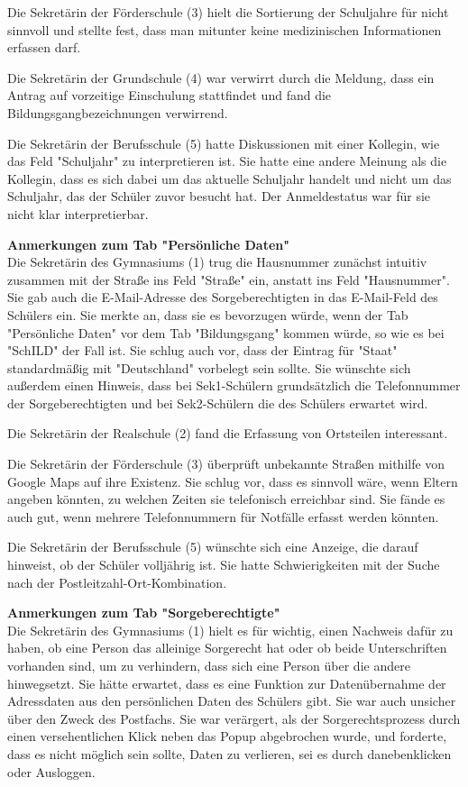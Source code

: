 Die Sekretärin der Förderschule (3) hielt die Sortierung der Schuljahre für nicht sinnvoll und stellte fest, dass man mitunter keine medizinischen Informationen erfassen darf.

Die Sekretärin der Grundschule (4) war verwirrt durch die Meldung, dass ein Antrag auf vorzeitige Einschulung stattfindet und fand die Bildungsgangbezeichnungen verwirrend.

Die Sekretärin der Berufsschule (5) hatte Diskussionen mit einer Kollegin, wie das Feld "Schuljahr" zu interpretieren ist. Sie hatte eine andere Meinung als die Kollegin, dass es sich dabei um das aktuelle Schuljahr handelt und nicht um das Schuljahr, das der Schüler zuvor besucht hat. Der Anmeldestatus war für sie nicht klar interpretierbar.

\textbf{Anmerkungen zum Tab "Persönliche Daten"}\\
Die Sekretärin des Gymnasiums (1) trug die Hausnummer zunächst intuitiv zusammen mit der Straße ins Feld "Straße" ein, anstatt ins Feld "Hausnummer". Sie gab auch die E-Mail-Adresse des Sorgeberechtigten in das E-Mail-Feld des Schülers ein. Sie merkte an, dass sie es bevorzugen würde, wenn der Tab "Persönliche Daten" vor dem Tab "Bildungsgang" kommen würde, so wie es bei "SchILD" der Fall ist. Sie schlug auch vor, dass der Eintrag für "Staat" standardmäßig mit "Deutschland" vorbelegt sein sollte. Sie wünschte sich außerdem einen Hinweis, dass bei Sek1-Schülern grundsätzlich die Telefonnummer der Sorgeberechtigten und bei Sek2-Schülern die des Schülers erwartet wird.

Die Sekretärin der Realschule (2) fand die Erfassung von Ortsteilen interessant.

Die Sekretärin der Förderschule (3) überprüft unbekannte Straßen mithilfe von Google Maps auf ihre Existenz. Sie schlug vor, dass es sinnvoll wäre, wenn Eltern angeben könnten, zu welchen Zeiten sie telefonisch erreichbar sind. Sie fände es auch gut, wenn mehrere Telefonnummern für Notfälle erfasst werden könnten.

Die Sekretärin der Berufsschule (5) wünschte sich eine Anzeige, die darauf hinweist, ob der Schüler volljährig ist. Sie hatte Schwierigkeiten mit der Suche nach der Postleitzahl-Ort-Kombination.

\textbf{Anmerkungen zum Tab "Sorgeberechtigte"}\\
Die Sekretärin des Gymnasiums (1) hielt es für wichtig, einen Nachweis dafür zu haben, ob eine Person das alleinige Sorgerecht hat oder ob beide Unterschriften vorhanden sind, um zu verhindern, dass sich eine Person über die andere hinwegsetzt. Sie hätte erwartet, dass es eine Funktion zur Datenübernahme der Adressdaten aus den persönlichen Daten des Schülers gibt. Sie war auch unsicher über den Zweck des Postfachs. Sie war verärgert, als der Sorgerechtsprozess durch einen versehentlichen Klick neben das Popup abgebrochen wurde, und forderte, dass es nicht möglich sein sollte, Daten zu verlieren, sei es durch danebenklicken oder Ausloggen.

